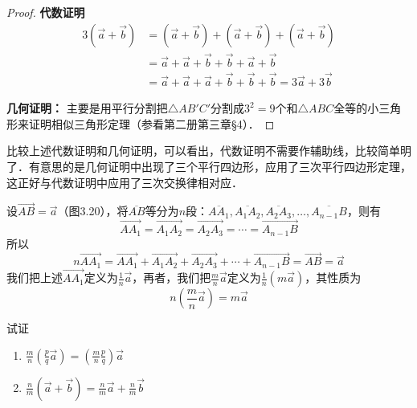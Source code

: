 \begin{proof}
\textbf{代数证明}
\begin{align*}
3 \left(\vec{a}+\vec{b}\right) &= \left(\vec{a}+\vec{b}\right)+\left(\vec{a}+\vec{b}\right)+\left(\vec{a}+\vec{b}\right)  \tag{用一次交换律}\\
&=\vec{a}+\vec{a}+\vec{b}+\vec{b}+\vec{a}+\vec{b} \tag{用两次交换律}\\
&= \vec{a}+\vec{a}+\vec{a}+\vec{b}+\vec{b}+\vec{b} =3\vec{a}+3\vec{b}
\end{align*}

\textbf{几何证明：}
主要是用平行分割把$\triangle AB'C'$分割成$3^2=9$个和$\triangle ABC$全等的小三角形来证明相似三角形定理（参看第二册第三章\S 4）．
\end{proof}

比较上述代数证明和几何证明，可以看出，代数证明不需要作辅助线，比较简单明了．有意思的是几何证明中出现了三个平行四边形，应用了三次平行四边形定理，这正好与代数证明中应用了三次交换律相对应．

设$\Vec{AB}=\vec{a}$（图3.20），将$\overline{AB}$等分为$n$段：$\overline{AA_1},\overline{A_1A_2},\overline{A_2A_3},\ldots,\overline{A_{n-1}B}$，则有
\[\Vec{AA_1}=\Vec{A_1A_2}=\Vec{A_2A_3}=\cdots=\Vec{A_{n-1}B}\]
所以
\[n\Vec{AA_1}=\Vec{AA_1}+\Vec{A_1A_2}+\Vec{A_2A_3}+\cdots+\Vec{A_{n-1}B}=\Vec{AB}=\vec{a}\]
我们把上述$\Vec{AA_1}$定义为$\frac{1}{n}\vec{a}$，再者，我们把$\frac{m}{n}\vec{a}$定义为$\frac{1}{n}\left(m\vec{a}\right)$，其性质为
\[n\left(\frac{m}{n}\vec{a}\right)=m\vec{a}\]


\begin{example}
    试证
\begin{enumerate}
    \item $\frac{m}{n}\left(\frac{p}{q}\vec{a}\right)=\left(\frac{m}{n}\frac{p}{q}\right)\vec{a}$
    \item $\frac{n}{m}\left(\vec{a}+\vec{b}\right)=\frac{n}{m}\vec{a}+\frac{n}{m}\vec{b}$
\end{enumerate}
\end{example}

